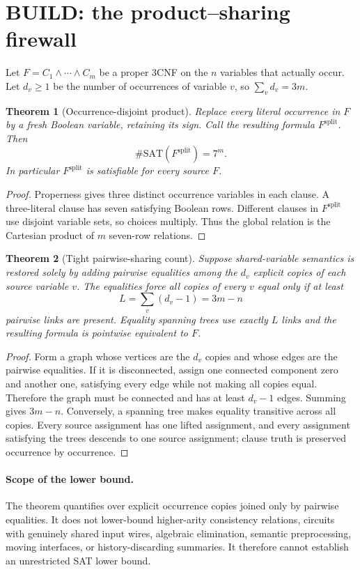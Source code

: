 \documentclass[11pt]{article}
\newtheorem{theorem}{Theorem}
\begin{document}
\section{BUILD: the product--sharing firewall}
Let $F=C_1\wedge\cdots\wedge C_m$ be a proper 3CNF on the $n$ variables that
actually occur.  Let $d_v\ge1$ be the number of occurrences of variable $v$,
so $\sum_vd_v=3m$.

\begin{theorem}[Occurrence-disjoint product]
Replace every literal occurrence in $F$ by a fresh Boolean variable, retaining
its sign.  Call the resulting formula $F^{\mathrm{split}}$.  Then
\[
  \#\mathrm{SAT}(F^{\mathrm{split}})=7^m.
\]
In particular $F^{\mathrm{split}}$ is satisfiable for every source $F$.
\end{theorem}
\begin{proof}
Properness gives three distinct occurrence variables in each clause.  A
three-literal clause has seven satisfying Boolean rows.  Different clauses in
$F^{\mathrm{split}}$ use disjoint variable sets, so choices multiply.  Thus
the global relation is the Cartesian product of $m$ seven-row relations.
\end{proof}

\begin{theorem}[Tight pairwise-sharing count]
Suppose shared-variable semantics is restored solely by adding pairwise
equalities among the $d_v$ explicit copies of each source variable $v$.  The
equalities force all copies of every $v$ equal only if at least
\[
  L=\sum_v(d_v-1)=3m-n
\]
pairwise links are present.  Equality spanning trees use exactly $L$ links and
the resulting formula is pointwise equivalent to $F$.
\end{theorem}
\begin{proof}
Form a graph whose vertices are the $d_v$ copies and whose edges are the
pairwise equalities.  If it is disconnected, assign one connected component
zero and another one, satisfying every edge while not making all copies
equal.  Therefore the graph must be connected and has at least $d_v-1$ edges.
Summing gives $3m-n$.  Conversely, a spanning tree makes equality transitive
across all copies.  Every source assignment has one lifted assignment, and
every assignment satisfying the trees descends to one source assignment;
clause truth is preserved occurrence by occurrence.
\end{proof}

\paragraph{Scope of the lower bound.}
The theorem quantifies over explicit occurrence copies joined only by
pairwise equalities.  It does not lower-bound higher-arity consistency
relations, circuits with genuinely shared input wires, algebraic elimination,
semantic preprocessing, moving interfaces, or history-discarding summaries.
It therefore cannot establish an unrestricted SAT lower bound.
\end{document}
